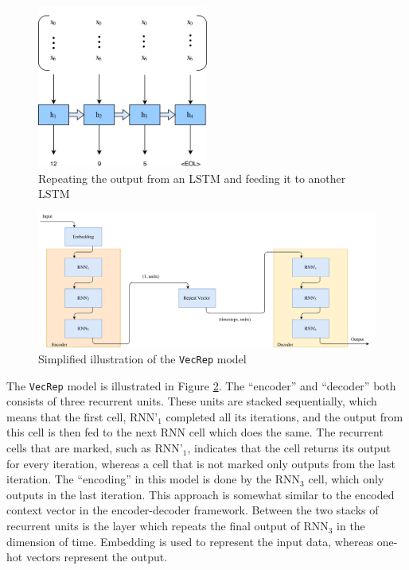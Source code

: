 \begin{figure}[ht]
    \centering
    \includegraphics[width=0.5\textwidth]{fig/development_process/lstm-vector-projection-decoder.png}
    \caption{Repeating the output from an LSTM and feeding it to another LSTM}
    \label{fig:lstm-vector-projection-decoder}
\end{figure}

\begin{figure}[!ht]
    \centering
    \includegraphics[width=1\textwidth]{fig/models/vecrep_model.png}
    \caption{Simplified illustration of the {\tt VecRep} model}
    \label{fig:vecrep_model}
\end{figure}

\newpage
The {\tt VecRep} model is illustrated in Figure \ref{fig:vecrep_model}. The ``encoder'' and ``decoder'' both consists of three recurrent units. These units are stacked sequentially, which means that the first cell, \(\text{RNN'}_1\) completed all its iterations, and the output from this cell is then fed to the next RNN cell which does the same. The recurrent cells that are marked, such as \(\text{RNN'}_1\), indicates that the cell returns its output for every iteration, whereas a cell that is not marked only outputs from the last iteration. The ``encoding'' in this model is done by the \(\text{RNN}_3\) cell, which only outputs in the last iteration. This approach is somewhat similar to the encoded context vector in the encoder-decoder framework. Between the two stacks of recurrent units is the layer which repeats the final output of \(\text{RNN}_3\) in the dimension of time. Embedding is used to represent the input data, whereas one-hot vectors represent the output. 

